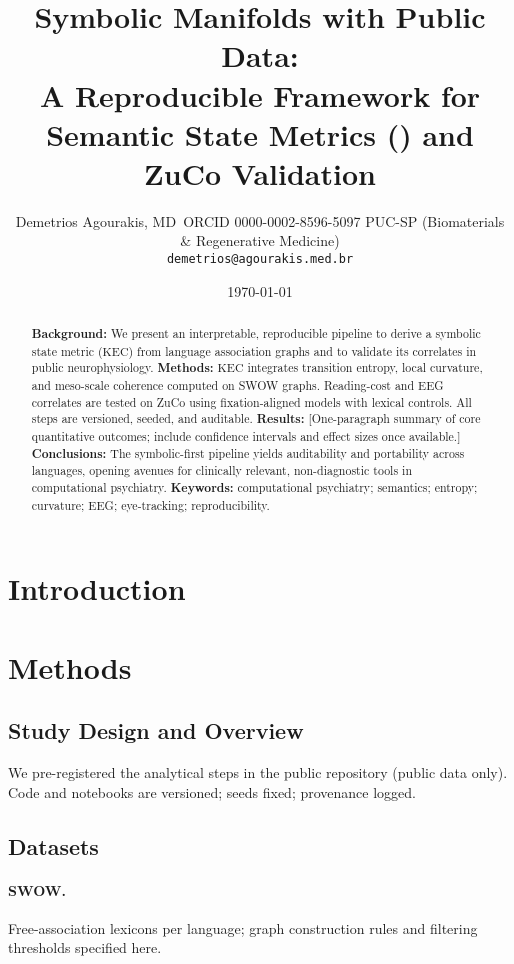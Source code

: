\documentclass[11pt]{article}
\title{Symbolic Manifolds with Public Data:\\
A Reproducible Framework for Semantic State Metrics (\kec{}) and ZuCo Validation}
\author{Demetrios Agourakis, MD\
\small ORCID 0000-0002-8596-5097 \quad PUC-SP (Biomaterials \& Regenerative Medicine)\\
\small \texttt{demetrios@agourakis.med.br} }
\date{\today}
\newcommand{\kec}{\ensuremath{\mathrm{KEC}}}
\begin{document}
\maketitle

\begin{abstract}
\textbf{Background:} We present an interpretable, reproducible pipeline to derive a symbolic state metric (\kec{}) from language association graphs and to validate its correlates in public neurophysiology.
\textbf{Methods:} \kec{} integrates transition entropy, local curvature, and meso-scale coherence computed on SWOW graphs. Reading-cost and EEG correlates are tested on ZuCo using fixation-aligned models with lexical controls. All steps are versioned, seeded, and auditable.
\textbf{Results:} [One-paragraph summary of core quantitative outcomes; include confidence intervals and effect sizes once available.]
\textbf{Conclusions:} The symbolic-first pipeline yields auditability and portability across languages, opening avenues for clinically relevant, non-diagnostic tools in computational psychiatry.
\textbf{Keywords:} computational psychiatry; semantics; entropy; curvature; EEG; eye-tracking; reproducibility.
\end{abstract}

\section{Introduction}

\section{Methods}
\subsection{Study Design and Overview}
We pre-registered the analytical steps in the public repository (public data only). Code and notebooks are versioned; seeds fixed; provenance logged.

\subsection{Datasets}
\paragraph{SWOW.} Free-association lexicons per language; graph construction rules and filtering thresholds specified here.
\end{document}
